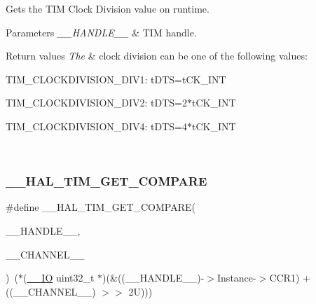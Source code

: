 Gets the T\+IM Clock Division value on runtime. 


\begin{DoxyParams}{Parameters}
{\em \+\_\+\+\_\+\+H\+A\+N\+D\+L\+E\+\_\+\+\_\+} & T\+IM handle. \\
\hline
\end{DoxyParams}

\begin{DoxyRetVals}{Return values}
{\em The} & clock division can be one of the following values\+: \begin{DoxyItemize}
\item T\+I\+M\+\_\+\+C\+L\+O\+C\+K\+D\+I\+V\+I\+S\+I\+O\+N\+\_\+\+D\+I\+V1\+: t\+D\+TS=t\+C\+K\+\_\+\+I\+NT \item T\+I\+M\+\_\+\+C\+L\+O\+C\+K\+D\+I\+V\+I\+S\+I\+O\+N\+\_\+\+D\+I\+V2\+: t\+D\+TS=2$\ast$t\+C\+K\+\_\+\+I\+NT \item T\+I\+M\+\_\+\+C\+L\+O\+C\+K\+D\+I\+V\+I\+S\+I\+O\+N\+\_\+\+D\+I\+V4\+: t\+D\+TS=4$\ast$t\+C\+K\+\_\+\+I\+NT \end{DoxyItemize}
\\
\hline
\end{DoxyRetVals}
\mbox{\label{group___t_i_m___exported___macros_gaa40722f56910966e1da5241b610eed84}} 
\subsubsection{\texorpdfstring{\+\_\+\+\_\+\+H\+A\+L\+\_\+\+T\+I\+M\+\_\+\+G\+E\+T\+\_\+\+C\+O\+M\+P\+A\+RE}{\_\_HAL\_TIM\_GET\_COMPARE}}
{\footnotesize\ttfamily \#define \+\_\+\+\_\+\+H\+A\+L\+\_\+\+T\+I\+M\+\_\+\+G\+E\+T\+\_\+\+C\+O\+M\+P\+A\+RE(\begin{DoxyParamCaption}\item[{}]{\+\_\+\+\_\+\+H\+A\+N\+D\+L\+E\+\_\+\+\_\+,  }\item[{}]{\+\_\+\+\_\+\+C\+H\+A\+N\+N\+E\+L\+\_\+\+\_\+ }\end{DoxyParamCaption})~($\ast$(\mbox{\hyperlink{core__sc300_8h_aec43007d9998a0a0e01faede4133d6be}{\+\_\+\+\_\+\+IO}} uint32\+\_\+t $\ast$)(\&((\+\_\+\+\_\+\+H\+A\+N\+D\+L\+E\+\_\+\+\_\+)-\/$>$Instance-\/$>$C\+C\+R1) + ((\+\_\+\+\_\+\+C\+H\+A\+N\+N\+E\+L\+\_\+\+\_\+) $>$$>$ 2\+U)))}



